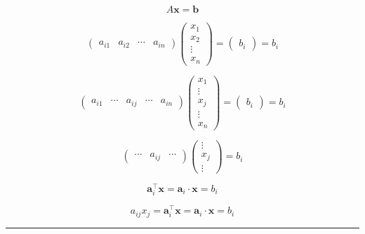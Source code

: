 \documentclass[
]{book}
\theoremstyle{definition}
\theoremstyle{definition}
\theoremstyle{definition}
\theoremstyle{definition}
\theoremstyle{remark}
\begin{document}
\[
A\boldsymbol{x}=\boldsymbol{b}
\]

\[
\begin{pmatrix}a_{{\scriptscriptstyle i1}} & a_{{\scriptscriptstyle i2}} & \cdots & a_{{\scriptscriptstyle in}}\end{pmatrix}\begin{pmatrix}x_{{\scriptscriptstyle 1}}\\
x_{{\scriptscriptstyle 2}}\\
\vdots\\
x_{{\scriptscriptstyle n}}
\end{pmatrix}=\begin{pmatrix}b_{{\scriptscriptstyle i}}\end{pmatrix}=b_{{\scriptscriptstyle i}}
\]

\[
\begin{pmatrix}a_{{\scriptscriptstyle i1}} & \cdots & a_{{\scriptscriptstyle ij}} & \cdots & a_{{\scriptscriptstyle in}}\end{pmatrix}\begin{pmatrix}x_{{\scriptscriptstyle 1}}\\
\vdots\\
x_{{\scriptscriptstyle j}}\\
\vdots\\
x_{{\scriptscriptstyle n}}
\end{pmatrix}=\begin{pmatrix}b_{{\scriptscriptstyle i}}\end{pmatrix}=b_{{\scriptscriptstyle i}}
\]

\[
\begin{pmatrix}\cdots & a_{{\scriptscriptstyle ij}} & \cdots\end{pmatrix}\begin{pmatrix}\vdots\\
x_{{\scriptscriptstyle j}}\\
\vdots
\end{pmatrix}=b_{{\scriptscriptstyle i}}
\]

\[
\boldsymbol{a}_{{\scriptscriptstyle i}}^{\intercal}\boldsymbol{x}=\boldsymbol{a}_{{\scriptscriptstyle i}}\cdot\boldsymbol{x}=b_{i}
\]

\[
a_{{\scriptscriptstyle ij}}x_{{\scriptscriptstyle j}}=\boldsymbol{a}_{{\scriptscriptstyle i}}^{\intercal}\boldsymbol{x}=\boldsymbol{a}_{{\scriptscriptstyle i}}\cdot\boldsymbol{x}=b_{i}
\]

\begin{center}\rule{0.5\linewidth}{0.5pt}\end{center}
\end{document}
